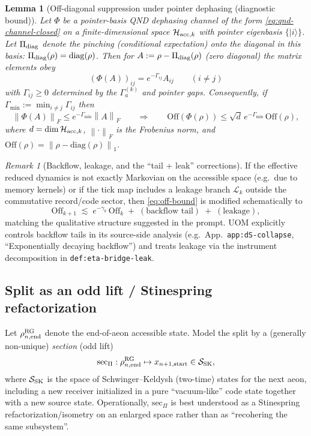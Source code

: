 \documentclass[11pt]{article}
\theoremstyle{definition}
\theoremstyle{plain}
\newtheorem{lemma}[definition]{Lemma}
\theoremstyle{remark}
\newtheorem{remark}[definition]{Remark}
\newcommand{\cH}{\mathcal H}
\newcommand{\cL}{\mathcal L}
\newcommand{\diag}{\mathrm{diag}}
\newcommand{\norm}[1]{\left\lVert #1\right\rVert}
\begin{document}
\begin{lemma}[Off-diagonal suppression under pointer dephasing (diagnostic bound)]
Let $\Phi$ be a pointer-basis QND dephasing channel of the form \eqref{eq:qnd-channel-closed} on a finite-dimensional
space $\cH_{{\rm acc},k}$ with pointer eigenbasis $\{\lvert i\rangle\}$.
Let $\Pi_{\rm diag}$ denote the pinching (conditional expectation) onto the diagonal in this basis:
$\Pi_{\rm diag}(\rho)=\diag(\rho)$.
Then for $A:=\rho-\Pi_{\rm diag}(\rho)$ (zero diagonal) the matrix elements obey
\[
(\Phi(A))_{ij}=e^{-\Gamma_{ij}}A_{ij}\qquad (i\neq j)
\]
with $\Gamma_{ij}\ge 0$ determined by the $\Gamma_a^{(k)}$ and pointer gaps.
Consequently, if $\Gamma_{\min}:=\min_{i\neq j}\Gamma_{ij}$ then
\begin{equation}
\norm{\Phi(A)}_F \le e^{-\Gamma_{\min}}\norm{A}_F
\qquad\Longrightarrow\qquad
\mathrm{Off}(\Phi(\rho)) \le \sqrt{d}\,e^{-\Gamma_{\min}}\,\mathrm{Off}(\rho),
\label{eq:off-bound}
\end{equation}
where $d=\dim\cH_{{\rm acc},k}$, $\norm{\cdot}_F$ is the Frobenius norm, and $\mathrm{Off}(\rho)=\norm{\rho-\diag(\rho)}_1$.
\end{lemma}

\begin{remark}[Backflow, leakage, and the ``tail + leak'' corrections]
If the effective reduced dynamics is not exactly Markovian on the accessible space (e.g.\ due to memory kernels) or if the
tick map includes a leakage branch $\cL_k$ outside the commutative record/code sector, then
\eqref{eq:off-bound} is modified schematically to
\[
\mathrm{Off}_{k+1}
\;\lesssim\;
e^{-\gamma_k}\,\mathrm{Off}_k
\;+\;(\text{backflow tail})
\;+\;(\text{leakage}),
\]
matching the qualitative structure suggested in the prompt. UOM explicitly controls backflow tails in its source-side
analysis (e.g.\ App.\ \texttt{app:dS-collapse}, ``Exponentially decaying backflow'') and treats leakage via the instrument
decomposition in \texttt{def:eta-bridge-leak}.
\end{remark}

\subsection{Split as an odd lift / Stinespring refactorization}
\label{subsec:split-as-lift}

Let $\rho_{n,{\rm end}}^{\rm RG}$ denote the end-of-aeon accessible state.
Model the split by a (generally non-unique) \emph{section} (odd lift)
\begin{equation}
\mathrm{sec}_\Pi:\rho_{n,{\rm end}}^{\rm RG}\mapsto x_{n+1,{\rm start}}\in \mathcal S_{\rm SK},
\label{eq:secpi}
\end{equation}
where $\mathcal S_{\rm SK}$ is the space of Schwinger--Keldysh (two-time) states for the next aeon, including a new
receiver initialized in a pure ``vacuum-like'' code state together with a new source state.
Operationally, $\mathrm{sec}_\Pi$ is best understood as a Stinespring refactorization/isometry on an enlarged space
rather than as ``recohering the same subsystem''.
\end{document}
